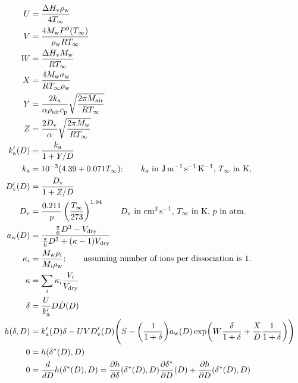 \documentclass{article}
\begin{document}
\begin{align}
  U &= \frac{\Delta H_{\rm v} \rho_{\rm w}}{4 T_{\infty}} \\
  V &= \frac{4 M_{\rm w} P^{\rm 0}(T_{\infty})}{\rho_{\rm w} R T_{\infty}} \\
  W &= \frac{\Delta H_{\rm v} M_{\rm w}}{R T_{\infty}} \\
  X &= \frac{4 M_{\rm w}\sigma_{\rm w}}{R T_{\infty} \rho_{\rm w}} \\
  Y &= \frac{2 k_{\rm a}}{\alpha \rho_{\rm air} c_{\rm p}} \sqrt{\frac{2 \pi M_{\rm air}}{R T_{\infty}}} \\
  Z &= \frac{2 D_{\rm v}}{\alpha} \sqrt{\frac{2 \pi M_{\rm w}}{R T_{\infty}}} \\
  k_{\rm a}'(D) &= \frac{k_{\rm a}}{1 + Y / D} \\
  k_{\rm a} &= 10^{-3} (4.39 + 0.071  T_{\infty}); \qquad \text{$k_{\rm a}$ in $\rm J\,m^{-1}\, s^{-1} \, K^{-1}$, $T_{\infty}$ in K, }  \\
  D_{\rm v}'(D) &= \frac{D_{\rm v}}{1 + Z / D} \\
  D_{\rm v} &= \frac{0.211}{p} \left(\frac{T_{\infty}}{273}\right)^{1.94} \qquad \text{$D_{\rm v}$ in $\rm cm^2\, s^{-1}$, $T_{\infty}$ in K, $p$ in atm.}\\
  a_{\rm w}(D) &= \frac{\frac{\pi}{6}D^3 - V_{\rm dry}}{\frac{\pi}{6}D^3 + (\kappa - 1) V_{\rm dry}} \label{eq:aw}\\
   \kappa_i &= \frac{M_{\rm w} \rho_{i}}{M_{i}  \rho_{\rm w}}; \qquad \text{assuming number of ions per dissociation is 1.} \label{eq:kappa_indiv}\\
   \kappa &= \sum_i \kappa_i \frac{V_i}{V_{\rm dry}} \label{eq:kappa}\\
  \delta &=\frac{U}{k_{\rm a}'} D \dot{D}(D) \label{eq:delta}\\ 
  h(\delta, D) &= k_{\rm a}'(D) \delta
  - U V D_{\rm v}'(D) \Biggl(S - \biggl(\frac{1}{1+\delta}\biggr)
  a_{\rm w}(D)
  \exp\biggl(W \frac{\delta}{1+\delta} + \frac{X}{D} \frac{1}{1+\delta}\biggr) \Biggr) \\
  0 &= h(\delta^*(D), D) \\
  0 &= \frac{d}{d D} h(\delta^*(D), D)
  = \frac{\partial h}{\partial \delta}(\delta^*(D), D)
  \frac{\partial \delta^*}{\partial D}(D)
  + \frac{\partial h}{\partial D}(\delta^*(D), D) \\

\end{align}
\end{document}
